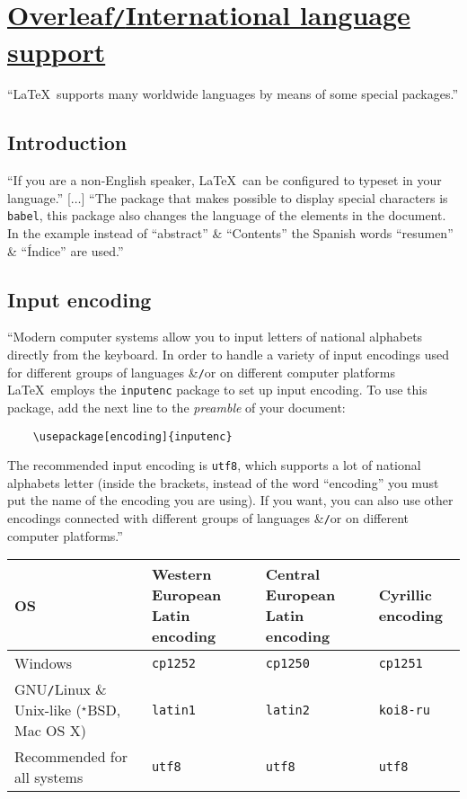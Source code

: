 \documentclass{article}
\numberwithin{equation}{section}
\begin{document}
\section{\href{https://www.overleaf.com/learn/latex/International_language_support}{Overleaf\texttt{/}International language support}}
``\LaTeX\ supports many worldwide languages by means of some special packages.''

\subsection{Introduction}
``If you are a non-English speaker, \LaTeX\ can be configured to typeset in your language.'' [$\ldots$] ``The package that makes possible to display special characters is \texttt{babel}, this package also changes the language of the elements in the document. In the example instead of ``abstract'' \& ``Contents'' the Spanish words ``resumen'' \& ``\'Indice'' are used.''

\subsection{Input encoding}
``Modern computer systems allow you to input letters of national alphabets directly from the keyboard. In order to handle a variety of input encodings used for different groups of languages \&\texttt{/}or on different computer platforms \LaTeX\ employs the \texttt{inputenc} package to set up input encoding. To use this package, add the next line to the \textit{preamble} of your document:
\begin{verbatim}
	\usepackage[encoding]{inputenc}
\end{verbatim}
The recommended input encoding is \texttt{utf8}, which supports a lot of national alphabets letter (inside the brackets, instead of the word ``encoding'' you must put the name of the encoding you are using). If you want, you can also use other encodings connected with different groups of languages \&\texttt{/}or on different computer platforms.''

\begin{table}[H]
	\centering
	\begin{tabular}{|p{5cm}|p{35mm}|p{35mm}|l|}
		\hline
		\textbf{OS} & \textbf{Western European Latin encoding} & \textbf{Central European Latin encoding} & \textbf{Cyrillic encoding} \\
		\hline
		Windows & \texttt{cp1252} & \texttt{cp1250} & \texttt{cp1251} \\
		\hline
		GNU\texttt{/}Linux \& Unix-like (${}^\star$BSD, Mac OS X) & \texttt{latin1} & \texttt{latin2} & \texttt{koi8-ru} \\
		\hline
		Recommended for all systems & \texttt{utf8} & \texttt{utf8} & \texttt{utf8} \\
		\hline
	\end{tabular}
\end{table}
\end{document}
